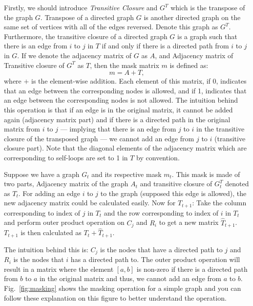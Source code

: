 \documentclass{lxaiproposal}
\begin{document}
    Firstly, we should introduce \textit{Transitive Closure} and $G^T$ which is the transpose of the graph $G$.
    Transpose of a directed graph $G$ is another directed graph on the same set of vertices with all of the edges
    reversed. Denote this graph as $G^T$. Furthermore, the transitive closure of a directed graph $G$ is a graph
    such that there is an edge from $i$ to $j$ in $T$ if and only if there is a directed path from $i$ to $j$ in
    $G$. If we denote the adjacency matrix of $G$ as $A$, and Adjacency matrix of Transitive closure of $G^T$ as $T$,
    then the mask matrix $m$ is defined as:
    \[
        m = A + T,
    \]
    where $+$ is the element-wise addition.
    Each element of this matrix, if 0, indicates that an edge between the corresponding nodes is allowed, and if 1,
    indicates that an edge between the corresponding nodes is not allowed. The intuition behind this operation is
    that if an edge is in the original matrix, it cannot be added again (adjacency matrix part) and if there is a
    directed path in the original matrix from $i$ to $j$ --- implying that there is an edge from $j$ to $i$ in the
    transitive closure of the transposed graph --- we cannot add an edge from $j$ to $i$ (transitive closure part).
    Note that the diagonal elements of the adjacency matrix which are corresponding to self-loops are set to 1 in $T$
    by convention.

    Suppose we have a graph $G_t$ and its respective mask $m_t$. This mask is made of two parts, Adjacency matrix of
    the graph $A_t$ and transitive closure of $G_t^T$ denoted as $T_{t}$. For adding an edge $i$ to $j$ to the
    graph (supposed this edge is allowed), the new adjacency matrix could be calculated easily. Now for $T_{t+1}$:
    Take the column corresponding to index of $j$ in $T_t$ and the row corresponding to index of $i$ in $T_t$ and
    perform outer product operation on $C_j$ and $R_i$ to get a new matrix $\hat{T}_{t+1}$. $T_{t+1}$ is then
    calculated as $T_t + \hat{T}_{t+1}$.

    The intuition behind this is: $C_j$ is the nodes that have a directed path to $j$ and $R_i$ is the nodes that
    $i$ has a directed path to. The outer product operation will result in a matrix where the element $[a, b]$ is
    non-zero if there is a directed path from $b$ to $a$ in the original matrix and thus, we cannot add an edge from
    $a$ to $b$. Fig.~\ref{fig:masking} shows the masking operation for a simple graph and you can follow these
    explanation on this figure to better understand the operation.
\end{document}
